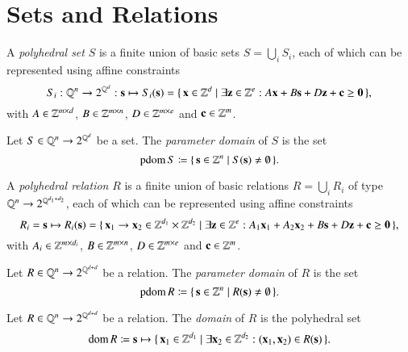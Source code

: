 \section{Sets and Relations}

\begin{definition}
A {\em polyhedral set} $S$ is a finite union of basic sets
$S = \bigcup_i S_i$, each of which can be represented using affine
constraints
$$
S_i : \Q^n \to 2^{\Q^d} : \vec s \mapsto
S_i(\vec s) =
\{\, \vec x \in \Z^d \mid \exists \vec z \in \Z^e :
A \vec x + B \vec s + D \vec z + \vec c \geq \vec 0 \,\}
,
$$
with $A \in \mathbb{Z}^{m \times d}$,
$B \in \mathbb{Z}^{m \times n}$,
$D \in \mathbb{Z}^{m \times e}$
and $\vec c \in \Z^m$.
\end{definition}

\begin{definition}
Let $S \in \mathbb{Q}^n \to 2^{\mathbb{Q}^d}$ be a set.
The {\em parameter domain} of $S$ is the set
$$\pdom S \coloneqq \{\, \vec s \in \Z^n \mid S(\vec s) \ne \emptyset \,\}.$$
\end{definition}

\begin{definition}
A {\em polyhedral relation}
$R$ is a finite union of basic relations
$R = \bigcup_i R_i$ of type
$\mathbb{Q}^n \to 2^{\mathbb{Q}^{d_1+d_2}}$,
each of which can be represented using affine
constraints
$$
R_i = \vec s \mapsto
R_i(\vec s) =
\{\, \vec x_1 \to \vec x_2 \in \Z^{d_1} \times \Z^{d_2}
\mid \exists \vec z \in \Z^e :
A_1 \vec x_1 + A_2 \vec x_2 + B \vec s + D \vec z + \vec c \geq \vec 0 \,\}
,
$$
with $A_i \in \mathbb{Z}^{m \times d_i}$,
$B \in \mathbb{Z}^{m \times n}$,
$D \in \mathbb{Z}^{m \times e}$
and $\vec c \in \Z^m$.
\end{definition}

\begin{definition}
Let $R \in \mathbb{Q}^n \to 2^{\mathbb{Q}^{d+d}}$ be a relation.
The {\em parameter domain} of $R$ is the set
$$\pdom R \coloneqq \{\, \vec s \in \Z^n \mid R(\vec s) \ne \emptyset \,\}.$$
\end{definition}

\begin{definition}
Let $R \in \mathbb{Q}^n \to 2^{\mathbb{Q}^{d+d}}$ be a relation.
The {\em domain} of $R$ is the polyhedral set
$$\domain R \coloneqq \vec s \mapsto
\{\, \vec x_1 \in \Z^{d_1} \mid \exists \vec x_2 \in \Z^{d_2} :
(\vec x_1, \vec x_2) \in R(\vec s) \,\}
.
$$
\end{definition}

